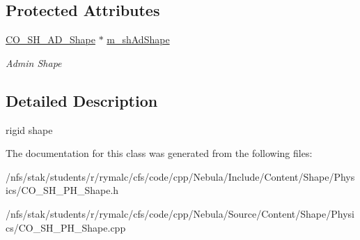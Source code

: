 \subsection*{Protected Attributes}
\begin{DoxyCompactItemize}
\item 
\hypertarget{classContent_1_1Shape_1_1Physics_1_1Shape_afedfddb1d080bcacda878196b5fdfc01}{
\hyperlink{classContent_1_1Shape_1_1Admin_1_1Shape}{CO\_\-SH\_\-AD\_\-Shape} $\ast$ \hyperlink{classContent_1_1Shape_1_1Physics_1_1Shape_afedfddb1d080bcacda878196b5fdfc01}{m\_\-shAdShape}}
\label{classContent_1_1Shape_1_1Physics_1_1Shape_afedfddb1d080bcacda878196b5fdfc01}

\begin{DoxyCompactList}\small\item\em Admin Shape \item\end{DoxyCompactList}\end{DoxyCompactItemize}


\subsection{Detailed Description}
rigid shape 

The documentation for this class was generated from the following files:\begin{DoxyCompactItemize}
\item 
/nfs/stak/students/r/rymalc/cfs/code/cpp/Nebula/Include/Content/Shape/Physics/CO\_\-SH\_\-PH\_\-Shape.h\item 
/nfs/stak/students/r/rymalc/cfs/code/cpp/Nebula/Source/Content/Shape/Physics/CO\_\-SH\_\-PH\_\-Shape.cpp\end{DoxyCompactItemize}

